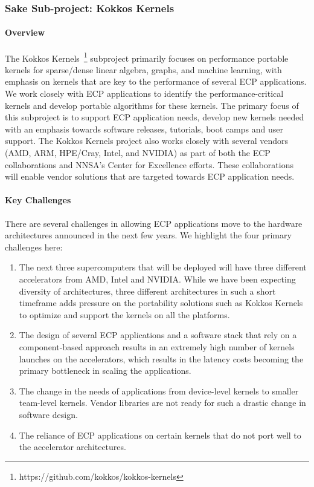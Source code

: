 \subsubsection{ Sake Sub-project: Kokkos Kernels} \label{subsubsect:kokkoskernels}
\paragraph{Overview} 
The Kokkos Kernels~\footnote{https://github.com/kokkos/kokkos-kernels} subproject primarily
focuses on performance portable kernels for sparse/dense linear algebra, graphs, and machine
learning, with emphasis on kernels that are key to the performance of
several ECP applications. We work closely with ECP applications to identify the
performance-critical kernels and develop portable algorithms for these kernels.
The primary focus of this subproject is to support ECP application needs, develop new
kernels needed with an emphasis towards software releases, tutorials, boot camps
and user support. The Kokkos Kernels project also works closely with several vendors
(AMD, ARM, HPE/Cray, Intel, and NVIDIA) as part of both the ECP collaborations and
NNSA's Center for Excellence efforts. These collaborations will enable vendor solutions
that are targeted towards ECP application needs.

\paragraph{Key  Challenges}
There are several challenges in allowing ECP applications move to the hardware architectures
announced in the next few years. We highlight the four primary challenges here:
\begin{enumerate}
\item 
The next three supercomputers that will be deployed will have
three different accelerators from AMD, Intel and NVIDIA. While we have been expecting diversity of architectures, three
different architectures in such a short timeframe adds pressure on the portability
solutions such as Kokkos Kernels to optimize and support the kernels on all the platforms.
\item
The design of several ECP applications and a software stack that rely on a component-based
approach results in an extremely high number of kernels launches on the accelerators, which
results in the latency costs becoming the primary bottleneck in scaling the applications.
\item
The change in the needs of applications from device-level kernels to smaller team-level kernels. Vendor
libraries are not ready for such a drastic change in software design.
\item 
The reliance of ECP applications on certain kernels that do not port well to the accelerator architectures.
\end{enumerate}

